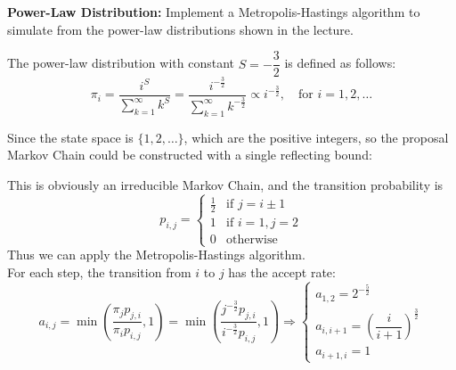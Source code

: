 \begin{homeworkProblem}

\textbf{Power-Law Distribution:} Implement a Metropolis-Hastings algorithm to simulate from the power-law distributions shown in the lecture.

\solution

The power-law distribution with constant $S=-\dfrac{3}{2}$ is defined as follows:
$$\pi_i=\dfrac{i^S}{\sum\limits_{k=1}^{\infty}k^S}=\dfrac{i^{-\frac{3}{2}}}{\sum\limits_{k=1}^{\infty}k^{-\frac{3}{2}}}\propto i^{-\frac{3}{2}}, \quad\text{for } i=1,2,\ldots$$

Since the state space is $\{1,2,\ldots \}$, which are the positive integers, so the proposal Markov Chain could be constructed with a single reflecting bound:
\begin{center}
\end{center}

This is obviously an irreducible Markov Chain, and the transition probability is
$$p_{i,j}=\begin{cases}
\frac{1}{2} & \text{if } j=i\pm 1 \\
1 & \text{if } i=1,j=2 \\
0 & \text{otherwise}
\end{cases}$$
Thus we can apply the Metropolis-Hastings algorithm. \\
For each step, the transition from $i$ to $j$ has the accept rate:
$$a_{i,j} = \min\left(\dfrac{\pi_jp_{j,i}}{\pi_ip_{i,j}},1\right) = \min\left(\dfrac{j^{-\frac{3}{2}}p_{j,i}}{i^{-\frac{3}{2}}p_{i,j}},1\right) \Rightarrow \begin{cases}
a_{1,2} = 2^{-\frac{5}{2}} \\
a_{i,i+1} = \left(\dfrac{i}{i+1}\right)^{\frac{3}{2}} \\
a_{i+1,i} = 1
\end{cases}$$


\end{homeworkProblem}
